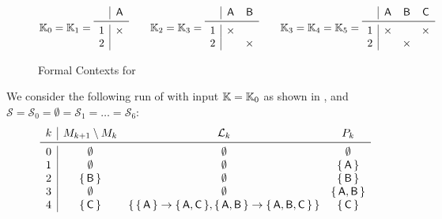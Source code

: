 \begin{Example}
  \label{exp:non-redundant-bases}
  \begin{figure}[tp]
    \centering
    \begin{equation*}
      \con K_0 = \con K_1 =
      \begin{array}{c | c}
        ~ & \mathsf{A} \\
        \midrule
        1 & \times \\
        2 & 
      \end{array}
      \qquad
      \con K_2 = \con K_3 =
      \begin{array}{c|cc}
        ~ & \mathsf{A} & \mathsf{B} \\
        \midrule
        1 & \times & \\
        2 &        & \times
      \end{array}
      \qquad
      \con K_3 = \con K_4 = \con K_5 =
      \begin{array}{c|ccc}
        ~ & \mathsf{A} & \mathsf{B} & \mathsf{C}\\
        \midrule
        1 & \times & & \times \\
        2 & & \times &
      \end{array}
    \end{equation*}
    \caption{Formal Contexts for }
    \label{fig:example-context-1}
  \end{figure}
  We consider the following run of  with input
  ${\mathbb{K}} = {\mathbb{K}}_0$ as shown in , and $\mathcal{S} =
  \mathcal{S}_0 = \emptyset = \mathcal{S}_1 = \ldots = \mathcal{S}_6$:
  \begin{equation*}
    \begin{array}{c|ccc}
      k & M_{k+1} \setminus M_k & \mathcal{L}_k & P_k \\
      \midrule
      0 & \emptyset      & \emptyset & \emptyset         \\
      1 & \emptyset      & \emptyset & \set{\mathsf{A}}    \\
      2 & \set{\mathsf{B}} & \emptyset & \set{\mathsf{B}}    \\
      3 & \emptyset      & \emptyset & \set{\mathsf{A}, \mathsf{B}} \\
      4 & \set{\mathsf{C}} & \set{\set{\mathsf{A}} \to \set{\mathsf{A},\mathsf{C}},
        \set{\mathsf{A},\mathsf{B}} \to \set{\mathsf{A}, \mathsf{B}, \mathsf{C}}} & \set{\mathsf{C}}\\

\end{array}
\end{equation*}
\end{Example}
